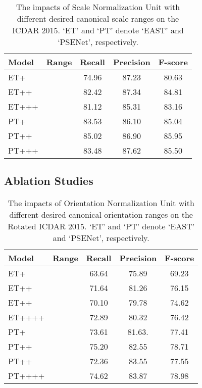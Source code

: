 \documentclass[10pt,twocolumn,letterpaper]{article}
\begin{document}
\begin{table}[t]
\renewcommand{\arraystretch}{1.1}
\small
\centering
\caption{The impacts of Scale Normalization Unit with different desired canonical scale ranges on the ICDAR 2015. `ET' and `PT' denote `EAST' and `PSENet', respectively.}\label{table:different-scales}
    \begin{tabular}{|l|c|c|c|c|}
      \hline
Model & Range & Recall & Precision  & F-score \\
      \hline\hline
ET+ &  & 74.96 & 87.23 & 80.63 \\
      ET++ &  & 82.42 & 87.34 & 84.81 \\
      ET+++ &  & 81.12 & 85.31 & 83.16 \\

      \hline\hline
PT+ &  & 83.53 & 86.10 & 85.04 \\
      PT++ &  & 85.02 & 86.90 & 85.95 \\
      PT+++ &  & 83.48 & 87.62 & 85.50 \\

      \hline
    \end{tabular}
\end{table}
















\subsection{Ablation Studies}\label{sec:ablation}




	
\begin{table}[ht]
\renewcommand{\arraystretch}{1.1}
\centering
\footnotesize
\caption{The impacts of Orientation Normalization Unit with different desired canonical orientation ranges on the Rotated ICDAR 2015. `ET' and `PT' denote `EAST' and `PSENet', respectively.}\label{table:different-orientations}
    \begin{tabular}{|l|l|c|c|c|}
      \hline
Model & Range & Recall & Precision  & F-score \\
      \hline\hline
ET+ &  & 63.64 & 75.89 & 69.23 \\
ET++ &  & 71.64 & 81.26 & 76.15 \\
      ET++ &   & 70.10 & 79.78 & 74.62 \\
      ET++++ &  & 72.89 & 80.32 & 76.42 \\

      \hline\hline
PT+ &  & 73.61 & 81.63. & 77.41 \\
PT++ &  & 75.20 & 82.55 & 78.71 \\
      PT++ &  & 72.36 & 83.55 & 77.55 \\
      PT++++ &  & 74.62 & 83.87 & 78.98 \\
      \hline
    \end{tabular}
\end{table}
\end{document}
